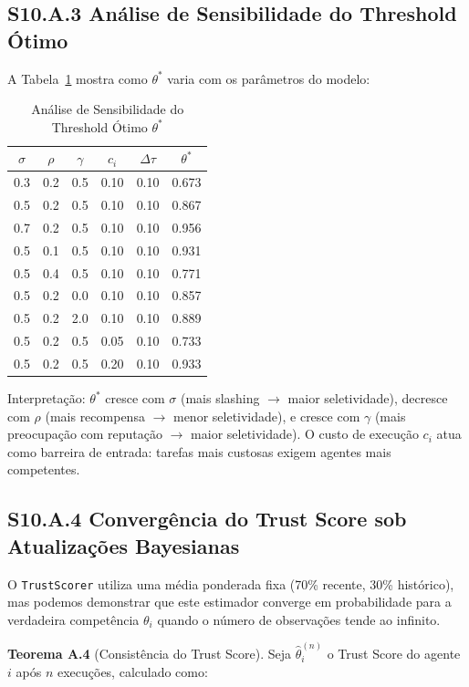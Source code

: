 \subsection*{S10.A.3 Análise de Sensibilidade do Threshold Ótimo}

A Tabela~\ref{tab:sensitivity_threshold} mostra como $\theta^*$ varia com os parâmetros do modelo:

\begin{table}[htbp]
\centering
\caption{Análise de Sensibilidade do Threshold Ótimo $\theta^*$}
\label{tab:sensitivity_threshold}
\begin{tabular}{cccccc}
\hline
$\sigma$ & $\rho$ & $\gamma$ & $c_i$ & $\Delta\tau$ & $\theta^*$ \\
\hline
0.3 & 0.2 & 0.5 & 0.10 & 0.10 & 0.673 \\
0.5 & 0.2 & 0.5 & 0.10 & 0.10 & 0.867 \\
0.7 & 0.2 & 0.5 & 0.10 & 0.10 & 0.956 \\
0.5 & 0.1 & 0.5 & 0.10 & 0.10 & 0.931 \\
0.5 & 0.4 & 0.5 & 0.10 & 0.10 & 0.771 \\
0.5 & 0.2 & 0.0 & 0.10 & 0.10 & 0.857 \\
0.5 & 0.2 & 2.0 & 0.10 & 0.10 & 0.889 \\
0.5 & 0.2 & 0.5 & 0.05 & 0.10 & 0.733 \\
0.5 & 0.2 & 0.5 & 0.20 & 0.10 & 0.933 \\
\hline
\end{tabular}
\end{table}

Interpretação: $\theta^*$ cresce com $\sigma$ (mais slashing $\to$ maior seletividade), decresce com $\rho$ (mais recompensa $\to$ menor seletividade), e cresce com $\gamma$ (mais preocupação com reputação $\to$ maior seletividade). O custo de execução $c_i$ atua como barreira de entrada: tarefas mais custosas exigem agentes mais competentes.

\subsection*{S10.A.4 Convergência do Trust Score sob Atualizações Bayesianas}

O \texttt{TrustScorer} utiliza uma média ponderada fixa (70\% recente, 30\% histórico), mas podemos demonstrar que este estimador converge em probabilidade para a verdadeira competência $\theta_i$ quando o número de observações tende ao infinito.

\textbf{Teorema A.4} (Consistência do Trust Score). Seja $\hat{\theta}_i^{(n)}$ o Trust Score do agente $i$ após $n$ execuções, calculado como:

